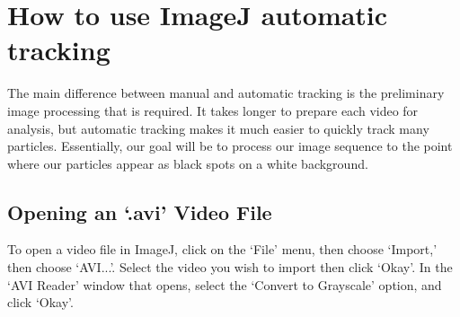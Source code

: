 \chapter{How to use ImageJ automatic tracking}
\thispagestyle{fancy}
The main difference between manual and automatic tracking is the preliminary image processing that is required. 
It takes longer to prepare each video for analysis, but automatic tracking makes it much easier to quickly track many particles. 
Essentially, our goal will be to process our image sequence to the point where our particles appear as black spots on a white background.
\section*{Opening an `.avi' Video File}
To open a video file in ImageJ, click on the `File' menu, then choose `Import,' then choose `AVI...'. 
Select the video you wish to import then click `Okay'. 
In the `AVI Reader' window that opens, select the `Convert to Grayscale' option, and click `Okay'.
